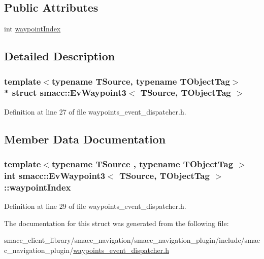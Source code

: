 \subsection*{Public Attributes}
\begin{DoxyCompactItemize}
\item 
int \hyperlink{structsmacc_1_1EvWaypoint3_a5736c13e1d5ef87363115c393c6e45cc}{waypoint\+Index}
\end{DoxyCompactItemize}


\subsection{Detailed Description}
\subsubsection*{template$<$typename T\+Source, typename T\+Object\+Tag$>$\\*
struct smacc\+::\+Ev\+Waypoint3$<$ T\+Source, T\+Object\+Tag $>$}



Definition at line 27 of file waypoints\+\_\+event\+\_\+dispatcher.\+h.



\subsection{Member Data Documentation}
\subsubsection[{\texorpdfstring{waypoint\+Index}{waypointIndex}}]{\setlength{\rightskip}{0pt plus 5cm}template$<$typename T\+Source , typename T\+Object\+Tag $>$ int {\bf smacc\+::\+Ev\+Waypoint3}$<$ T\+Source, T\+Object\+Tag $>$\+::waypoint\+Index}\hypertarget{structsmacc_1_1EvWaypoint3_a5736c13e1d5ef87363115c393c6e45cc}{}\label{structsmacc_1_1EvWaypoint3_a5736c13e1d5ef87363115c393c6e45cc}


Definition at line 29 of file waypoints\+\_\+event\+\_\+dispatcher.\+h.



The documentation for this struct was generated from the following file\+:\begin{DoxyCompactItemize}
\item 
smacc\+\_\+client\+\_\+library/smacc\+\_\+navigation/smacc\+\_\+navigation\+\_\+plugin/include/smacc\+\_\+navigation\+\_\+plugin/\hyperlink{waypoints__event__dispatcher_8h}{waypoints\+\_\+event\+\_\+dispatcher.\+h}\end{DoxyCompactItemize}
